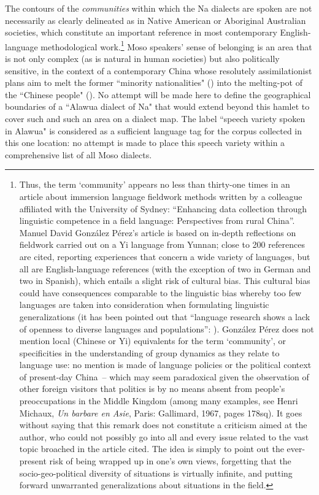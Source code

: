 The contours of the \emph{communities} within which the Na dialects are spoken are not necessarily as clearly delineated as in Native American or Aboriginal Australian societies, which constitute an important reference in most contemporary English-language methodological work.\footnote{Thus, the term `community' appears no less than thirty-one times in an article about immersion language fieldwork methods written by a colleague affiliated with the University of Sydney: “Enhancing data collection through linguistic competence in a field language: Perspectives from rural China”. Manuel David González Pérez's article is based on in-depth reflections on fieldwork carried out on a Yi language from Yunnan; close to 200 references are cited, reporting experiences that concern a wide variety of languages, but all are English-language references (with the exception of two in German and two in Spanish), which entails a slight risk of cultural bias. This cultural bias could have consequences comparable to the linguistic bias whereby too few languages are taken into consideration when formulating linguistic generalizations (it has been pointed out that “language research shows a lack of openness to diverse languages and populations”: \cite[23]{bochynska_reproducible_2023}). González Pérez does not mention local (Chinese or Yi) equivalents for the term `community', or specificities in the understanding of group dynamics as they relate to language use: no mention is made of language policies or the political context of present-day China~-- which may seem paradoxical given the observation of other foreign visitors that politics is by no means absent from people's preoccupations in the Middle Kingdom (among many examples, see Henri Michaux, \emph{Un barbare en Asie}, Paris: Gallimard, 1967, pages 178sq). It goes without saying that this remark does not constitute a criticism aimed at the author, who could not possibly go into all and every issue related to the vast topic broached in the article cited. The idea is simply to point out the ever-present risk of being wrapped up in one's own views, forgetting that the socio-geo-political diversity of situations is virtually infinite, and putting forward unwarranted generalizations about situations in the field.}
Moso speakers' sense of belonging is an area that is not only complex (as is natural in human societies) but also politically sensitive, in the context of a contemporary China whose resolutely assimilationist plans aim to melt the former ``minority nationalities" () into the melting-pot of the ``Chinese people" (). No attempt will be made here to define the geographical boundaries of a ``Alawua dialect of Na" that would extend beyond this hamlet to cover such and such an area on a dialect map. The label ``speech variety spoken in Alawua" is considered as a sufficient language tag for the corpus collected in this one location: no attempt is made to place this speech variety within a comprehensive list of all Moso dialects.

